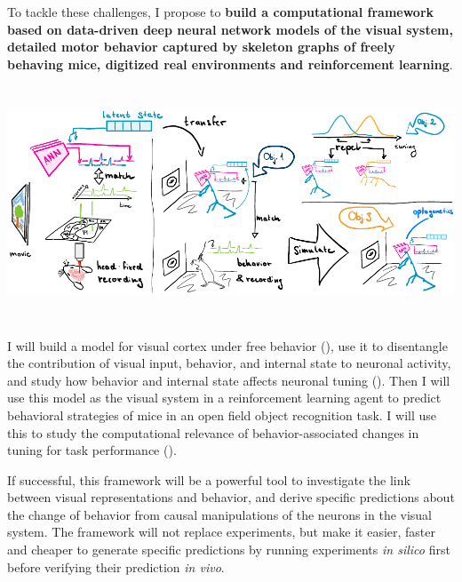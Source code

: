 \documentclass[B2,COG]{ercgrant}
\begin{document}
To tackle these challenges, I propose to \textbf{build a computational framework based on data-driven deep neural network models of the visual system, detailed motor behavior captured by skeleton graphs of freely behaving mice, digitized real environments and reinforcement learning}.

\includegraphics[width=\textwidth, height=7cm]{figures/overview.pdf}

I will build a model for visual cortex under free behavior (), use it to disentangle the contribution of visual input, behavior, and internal state to neuronal activity, and study how behavior and internal state affects neuronal tuning (). Then I will use this model as the visual system in a reinforcement learning agent to predict behavioral strategies of mice in an open field object recognition task. I will use this to study the computational relevance of behavior-associated changes in tuning for task performance ().

If successful, this framework will be a powerful tool to investigate the link between visual representations and behavior, and derive specific predictions about the change of behavior from causal manipulations of the neurons in the visual system.
The framework will not replace experiments, but make it easier, faster and cheaper to generate specific predictions by running experiments \textit{in silico} first before verifying their prediction \textit{in vivo}. 






\end{document}
